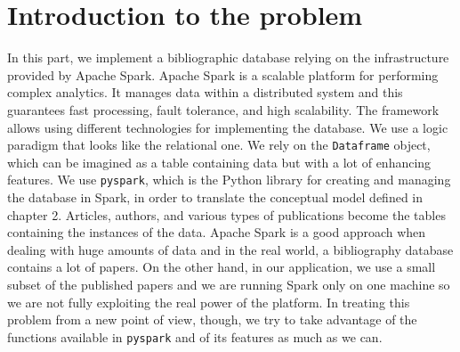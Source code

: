 \chapter{Introduction to the problem}
\label{ch:introduction_to_the_problem_spark}%
In this part, we implement a bibliographic database relying on the infrastructure provided by Apache Spark.
Apache Spark is a scalable platform for performing complex analytics.
It manages data within a distributed system and this guarantees fast processing, fault tolerance, and high scalability.
The framework allows using different technologies for implementing the database.
We use a logic paradigm that looks like the relational one.
We rely on the \verb|Dataframe| object, which can be imagined as a table containing data but with a lot of enhancing features.
We use \verb|pyspark|, which is the Python library for creating and managing the database in Spark, in order to translate the conceptual model defined in chapter 2.
Articles, authors, and various types of publications become the tables containing the instances of the data.
Apache Spark is a good approach when dealing with huge amounts of data and in the real world, a bibliography database contains a lot of papers.
On the other hand, in our application, we use a small subset of the published papers and we are running Spark only on one machine so we are not fully exploiting the real power of the platform.
In treating this problem from a new point of view, though, we try to take advantage of the functions available in \verb|pyspark| and of its features as much as we can.


